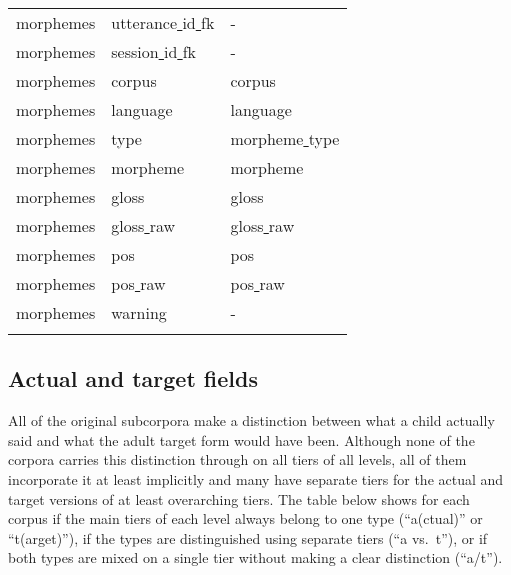 \documentclass[a4paper, 11pt]{book}
\newcommand{\und}{\underline{{ }}\hspace{0.2mm}}	%
\begin{document}
\begin{longtable}[ht!]{lll}
		morphemes				& utterance\und id\und fk & - \\
		morphemes				& session\und id\und fk & - \\
		morphemes				& corpus				& corpus \\
		morphemes				& language				& language \\
		morphemes				& type					& morpheme\und type \\
		morphemes				& morpheme				& morpheme \\
		morphemes				& gloss					& gloss \\
		morphemes				& gloss\und raw			& gloss\und raw \\
		morphemes				& pos					& pos \\
		morphemes				& pos\und raw			& pos\und raw \\
		morphemes				& warning				& - \\

		\label{tab:Columns in the merged table}
\end{longtable}


\subsection{Actual and target fields}
\label{subsec:Actual and target fields}

All of the original subcorpora make a distinction between what a child actually said and what the adult target form would have been. Although none of the corpora carries this distinction through on all tiers of all levels, all of them incorporate it at least implicitly and many have separate tiers for the actual and target versions of at least overarching tiers. The table below shows for each corpus if the main tiers of each level always belong to one type (“a(ctual)” or “t(arget)”), if the types are distinguished using separate tiers (“a vs.\ t”), or if both types are mixed on a single tier without making a clear distinction (“a/t”).
\end{document}
